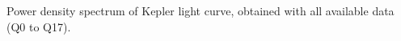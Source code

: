 \label{fig:seismo} Power density spectrum of Kepler light curve, obtained with all available data (Q0 to Q17). 
    
    
    
    
  
  